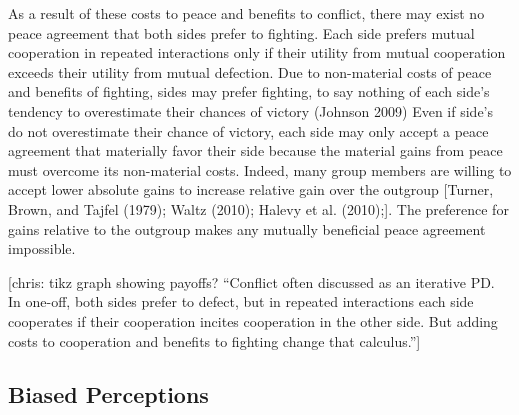 \documentclass[11pt]{article}
\begin{document}
As a result of these costs to peace and benefits to conflict, there may
exist no peace agreement that both sides prefer to fighting. Each side
prefers mutual cooperation in repeated interactions only if their
utility from mutual cooperation exceeds their utility from mutual
defection. Due to non-material costs of peace and benefits of fighting,
sides may prefer fighting, to say nothing of each side's tendency to
overestimate their chances of victory (Johnson 2009) Even if side's do
not overestimate their chance of victory, each side may only accept a
peace agreement that materially favor their side because the material
gains from peace must overcome its non-material costs. Indeed, many
group members are willing to accept lower absolute gains to increase
relative gain over the outgroup {[}Turner, Brown, and Tajfel (1979);
Waltz (2010); Halevy et al. (2010);{]}. The preference for gains
relative to the outgroup makes any mutually beneficial peace agreement
impossible.

{[}chris: tikz graph showing payoffs? ``Conflict often discussed as an
iterative PD. In one-off, both sides prefer to defect, but in repeated
interactions each side cooperates if their cooperation incites
cooperation in the other side. But adding costs to cooperation and
benefits to fighting change that calculus.''{]}

\hypertarget{biased-perceptions}{%
\subsection{Biased Perceptions}\label{biased-perceptions}}
\end{document}
